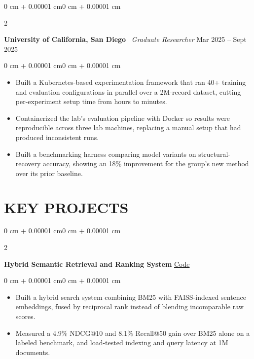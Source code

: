\documentclass[9pt, letterpaper]{extarticle}
\newenvironment{highlights}{
    \begin{itemize}[topsep=0.0 cm,parsep=0.0 cm,partopsep=0.0 cm,partopsep=0pt,itemsep=0pt,leftmargin=8pt]
}{\end{itemize}}
\newenvironment{onecolentry}{
    \begin{adjustwidth}{0 cm + 0.00001 cm}{0 cm + 0.00001 cm}
}{\end{adjustwidth}}
\newenvironment{twocolentry}[2][]{
    \onecolentry\def\secondColumn{#2}\setcolumnwidth{\fill, 4.5 cm}\begin{paracol}{2}
}{\switchcolumn \raggedleft \secondColumn\end{paracol}\endonecolentry}
\let\hrefWithoutArrow\href
\begin{document}
    \begin{twocolentry}{Mar 2025 -- Sept 2025}
        \textbf{University of California, San Diego} \textperiodcentered\ \textit{Graduate Researcher}
    \end{twocolentry}
    \vspace{0.01 cm}
    \begin{onecolentry}
        \begin{highlights}
            \item Built a Kubernetes-based experimentation framework that ran 40+ training and evaluation configurations in parallel over a 2M-record dataset, cutting per-experiment setup time from hours to minutes.
            \item Containerized the lab's evaluation pipeline with Docker so results were reproducible across three lab machines, replacing a manual setup that had produced inconsistent runs.
            \item Built a benchmarking harness comparing model variants on structural-recovery accuracy, showing an 18\% improvement for the group's new method over its prior baseline.
        \end{highlights}
    \end{onecolentry}
    \vspace{0.02 cm}

    \section{KEY PROJECTS}

    \begin{twocolentry}{\hrefWithoutArrow{https://github.com/sarac02/hybrid-retrieval}{Code}}
        \textbf{Hybrid Semantic Retrieval and Ranking System}
    \end{twocolentry}
    \begin{onecolentry}
        \begin{highlights}
            \item Built a hybrid search system combining BM25 with FAISS-indexed sentence embeddings, fused by reciprocal rank instead of blending incomparable raw scores.
            \item Measured a 4.9\% NDCG@10 and 8.1\% Recall@50 gain over BM25 alone on a labeled benchmark, and load-tested indexing and query latency at 1M documents.
        \end{highlights}
    \end{onecolentry}
    \vspace{0.02 cm}
\end{document}
